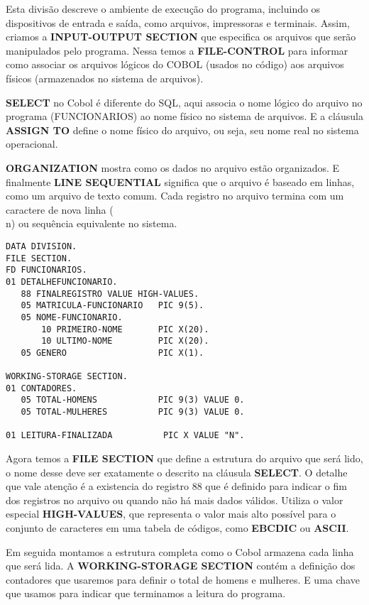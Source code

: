 Esta divisão descreve o ambiente de execução do programa, incluindo os dispositivos de entrada e saída, como arquivos, impressoras e terminais. Assim, criamos a \textbf{INPUT-OUTPUT SECTION} que especifica os arquivos que serão manipulados pelo programa. Nessa temos a \textbf{FILE-CONTROL} para informar como associar os arquivos lógicos do COBOL (usados no código) aos arquivos físicos (armazenados no sistema de arquivos).

\textbf{SELECT} no Cobol é diferente do SQL, aqui associa o nome lógico do arquivo no programa (FUNCIONARIOS) ao nome físico no sistema de arquivos. E a cláusula \textbf{ASSIGN TO} define o nome físico do arquivo, ou seja, seu nome real no sistema operacional.

\textbf{ORGANIZATION} mostra como os dados no arquivo estão organizados. E finalmente \textbf{LINE SEQUENTIAL} significa que o arquivo é baseado em linhas, como um arquivo de texto comum. Cada registro no arquivo termina com um caractere de nova linha (\\n) ou sequência equivalente no sistema.

\begin{lstlisting}[]
DATA DIVISION.
FILE SECTION.
FD FUNCIONARIOS.
01 DETALHEFUNCIONARIO.
   88 FINALREGISTRO VALUE HIGH-VALUES.
   05 MATRICULA-FUNCIONARIO   PIC 9(5).
   05 NOME-FUNCIONARIO.
       10 PRIMEIRO-NOME       PIC X(20).
       10 ULTIMO-NOME         PIC X(20).
   05 GENERO                  PIC X(1).

WORKING-STORAGE SECTION.
01 CONTADORES.
   05 TOTAL-HOMENS            PIC 9(3) VALUE 0.
   05 TOTAL-MULHERES          PIC 9(3) VALUE 0.

01 LEITURA-FINALIZADA          PIC X VALUE "N".	
\end{lstlisting}

Agora temos a \textbf{FILE SECTION} que define a estrutura do arquivo que será lido, o nome desse deve ser exatamente o descrito na cláusula \textbf{SELECT}. O detalhe que vale atenção é a existencia do registro 88 que é definido para indicar o fim dos registros no arquivo ou quando não há mais dados válidos. Utiliza o valor especial \textbf{HIGH-VALUES}, que representa o valor mais alto possível para o conjunto de caracteres em uma tabela de códigos, como \textbf{EBCDIC} ou \textbf{ASCII}.

Em seguida montamos a estrutura completa como o Cobol armazena cada linha que será lida. A \textbf{WORKING-STORAGE SECTION} contém a definição dos contadores que usaremos para definir o total de homens e mulheres. E uma chave que usamos para indicar que terminamos a leitura do programa.

